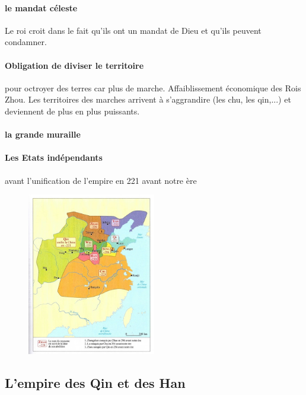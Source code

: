 \paragraph{le mandat céleste} Le roi croit dans le fait qu'ils ont un mandat de Dieu et qu'ils peuvent condamner.

\paragraph{Obligation de diviser le territoire} pour octroyer des terres car plus de marche. Affaiblissement économique des Rois Zhou.
Les territoires des marches arrivent à s'aggrandire (les chu, les qin,...) et deviennent de plus en plus puissants. 

\paragraph{la grande muraille} 


\paragraph{Les Etats indépendants} avant l’unification de l’empire en 221 avant notre ère
\begin{figure}[!h]
    \centering
\includegraphics[width=0.5\textwidth]{ConfucianismeTaoismeBouddhismeChinois/Images/CarteEtatsIndependants.jpg}

    \label{fig:enter-label}
\end{figure}


\subsection{L'empire des Qin et des Han }

